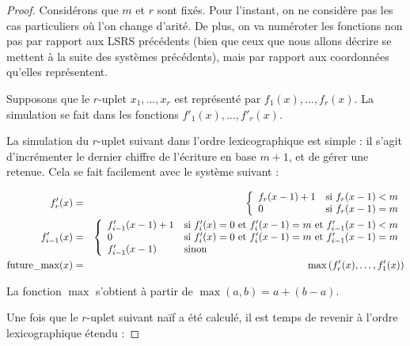 \documentclass{report}
\begin{document}
\begin{proof}
			Considérons que $m$ et $r$ sont fixés. Pour l'instant, on ne considère pas les cas particuliers où l'on change d'arité. De plus, on va numéroter les fonctions non pas par rapport aux LSRS précédents (bien que ceux que nous allons décrire se mettent à la suite des systèmes précédents), mais par rapport aux coordonnées qu'elles représentent. 
			
			Supposons que le $r$-uplet $x_1, \dots, x_r$ est représenté par $f_{1}(x), \dots, f_{r}(x)$. La simulation se fait dans les fonctions $f'_{1}(x), \dots, f'_{r}(x)$. 
			
			La simulation du $r$-uplet suivant dans l'ordre lexicographique est simple : il s'agit d'incrémenter le dernier chiffre de l'écriture en base $m+1$, et de gérer une retenue. Cela se fait facilement avec le système suivant :
			
			\begin{eqnarray}
				f'_{r}(x) & = &\left\lbrace \begin{array}{ll} 
									f_r(x-1)+1 & \text{si $f_r(x-1) < m$} \\
									0 & \text{si $f_r(x-1) = m$}
								 \end{array} \right.\\
				f'_{i-1}(x) & = & \left\lbrace \begin{array}{ll} 
									f'_{i-1}(x-1)+1 & \text{si $f'_{i}(x) = 0$ et $f'_{i}(x-1) = m$ et $f'_{i-1}(x-1) < m$} \\
									0 & \text{si $f'_{i}(x) = 0$ et $f'_{i}(x-1) = m$ et $f'_{i-1}(x-1) = m$} \\
									f'_{i-1}(x-1) & \text{sinon}
								 \end{array} \right. \\
				\text{future\_max}(x) & = & \max\left(f'_{r}(x), \dots, f'_{1}(x)\right)
			\end{eqnarray}
			
			La fonction $\max$ s'obtient à partir de $\max\left(a, b\right) = a + (b-a)$. 
						
			Une fois que le $r$-uplet suivant naïf a été calculé, il est temps de revenir à l'ordre lexicographique étendu :
			

\end{proof}
\end{document}
